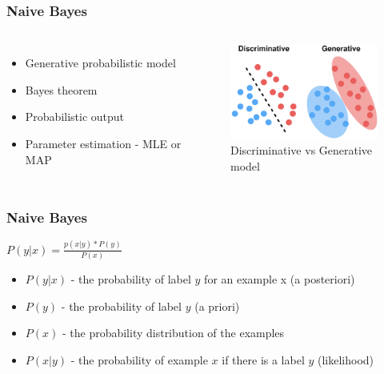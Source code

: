 \documentclass{beamer}
\begin{document}
\begin{frame}
	\frametitle{Naive Bayes}	
	\begin{columns}[c] %
		
		\begin{itemize}
			\item Generative probabilistic model
			\item Bayes theorem
			\item Probabilistic output
			\item Parameter estimation - MLE or MAP
		\end{itemize} 
			
		\begin{figure}[h]
			\centering
			\includegraphics[width=5cm]{discriminative}
			\caption{Discriminative vs Generative model}
		\end{figure}
		
	\end{columns}	
\end{frame}

\begin{frame}
	\frametitle{Naive Bayes}	
	\begin{theorem}
		$P(y|x) = \frac{p(x|y)*P(y)}{P(x)}$ 
	\end{theorem}
	
	\begin{itemize}
		\item $P(y|x)$ - the probability of label $y$ for an example x (a posteriori)
		\item $P(y)$ - the probability of label $y$ (a priori)
		\item $P(x)$ - the probability distribution of the examples
		\item $P(x|y)$ - the probability of example $x$ if there is a label $y$ (likelihood)
	\end{itemize}
\end{frame}
\end{document}
